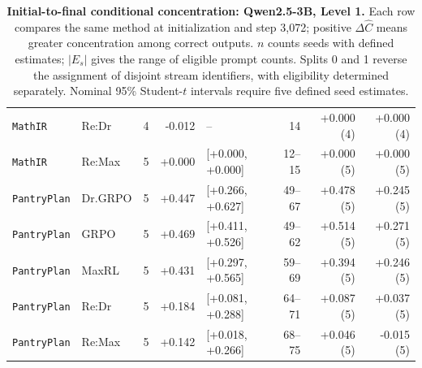 \begin{table}[!htbp]
\begin{tabular}{@{}llcrlrrr@{}}
\texttt{MathIR} & Re:Dr & 4 & -0.012 & -- & 14 & +0.000 (4) & +0.000 (4) \\
\texttt{MathIR} & Re:Max & 5 & +0.000 & [+0.000, +0.000] & 12--15 & +0.000 (5) & +0.000 (5) \\
\texttt{PantryPlan} & Dr.GRPO & 5 & +0.447 & [+0.266, +0.627] & 49--67 & +0.478 (5) & +0.245 (5) \\
\texttt{PantryPlan} & GRPO & 5 & +0.469 & [+0.411, +0.526] & 49--62 & +0.514 (5) & +0.271 (5) \\
\texttt{PantryPlan} & MaxRL & 5 & +0.431 & [+0.297, +0.565] & 59--69 & +0.394 (5) & +0.246 (5) \\
\texttt{PantryPlan} & Re:Dr & 5 & +0.184 & [+0.081, +0.288] & 64--71 & +0.087 (5) & +0.037 (5) \\
\texttt{PantryPlan} & Re:Max & 5 & +0.142 & [+0.018, +0.266] & 68--75 & +0.046 (5) & -0.015 (5) \\
\bottomrule
\end{tabular}
\caption{\textbf{Initial-to-final conditional concentration: Qwen2.5-3B, Level 1.} Each row compares the same method at initialization and step 3,072; positive $\Delta\widehat C$ means greater concentration among correct outputs. $n$ counts seeds with defined estimates; $|E_s|$ gives the range of eligible prompt counts. Splits 0 and 1 reverse the assignment of disjoint stream identifiers, with eligibility determined separately. Nominal 95\% Student-$t$ intervals require five defined seed estimates.}
\end{table}

